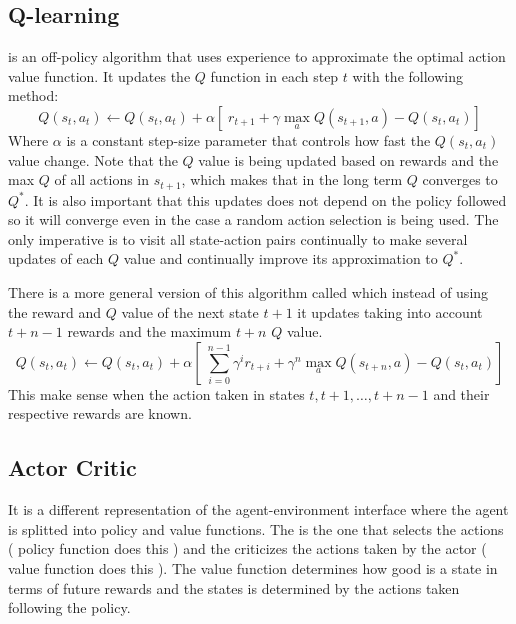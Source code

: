 \subsection{Q-learning\label{subsec:Qlearn}}
 is an off-policy algorithm that uses experience to approximate the optimal action value function. It updates the $Q$ function in each step $t$ with the following method:
\begin{equation}
    Q(s_t,a_t)\leftarrow Q(s_t,a_t) + \alpha [\;r_{t+1} + \gamma \max_a Q(s_{t+1},a) - Q(s_t,a_t)]
\end{equation}
\citep[Section~6.5]{sutton1998introduction}
Where $\alpha$ is a constant step-size parameter that controls how fast the $Q(s_t, a_t)$ value change. Note that the $Q$ value is being updated based on rewards and the max $Q$ of all actions in $s_{t+1}$, which makes that in the long term $Q$ converges to $Q^*$. It is also important that this updates does not depend on the policy followed so it will converge even in the case a random action selection is being used. The only imperative is to visit all state-action pairs continually to make several updates of each $Q$ value and continually improve its approximation to $Q^*$.

There is a more general version of this algorithm called  which instead of using the reward and $Q$ value of the next state $t+1$ it updates taking into account $t+n-1$ rewards and the maximum $t+n$ $Q$ value.
\begin{equation}
    Q(s_t,a_t)\leftarrow Q(s_t,a_t) + \alpha [\;\sum^{n-1}_{i=0}\gamma^i r_{t+i} + \gamma^n \max_a Q(s_{t+n},a) - Q(s_t,a_t)]
\end{equation}
This make sense when the action taken in states $t, t+1,\dots , t+n-1$ and their respective rewards are known.

\subsection{Actor Critic\label{subsec:AC}}
It is a different representation of the agent-environment interface where the agent is splitted into policy and value
functions. The  is the one that selects the actions ( policy function does this ) and the
 criticizes the actions taken by the actor ( value function does this ). The value function
determines how good is a state in terms of future rewards and the states is determined by the actions taken following the policy.

